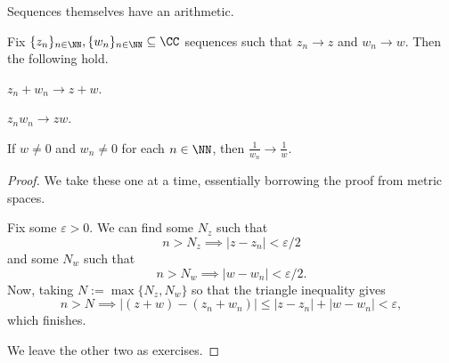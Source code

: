Sequences themselves have an arithmetic.
\begin{proposition}
	Fix $\{z_n\}_{n\in\NN},\{w_n\}_{n\in\NN}\subseteq\CC$ sequences such that $z_n\to z$ and $w_n\to w$. Then the following hold.
	\begin{listalph}
		\item $z_n+w_n\to z+w$.
		\item $z_nw_n\to zw$.
		\item If $w\ne0$ and $w_n\ne0$ for each $n\in\NN$, then $\frac1{w_n}\to\frac1w$.
	\end{listalph}
\end{proposition}
\begin{proof}
	We take these one at a time, essentially borrowing the proof from metric spaces.
	\begin{listalph}
		\item Fix some $\varepsilon>0$. We can find some $N_z$ such that
		\[n>N_z\implies|z-z_n|<\varepsilon/2\]
		and some $N_w$ such that
		\[n>N_w\implies|w-w_n|<\varepsilon/2.\]
		Now, taking $N:=\max\{N_z,N_w\}$ so that the triangle inequality gives
		\[n>N\implies|(z+w)-(z_n+w_n)|\le|z-z_n|+|w-w_n|<\varepsilon,\]
		which finishes.
	\end{listalph}
	We leave the other two as exercises.\todo{}
\end{proof}

